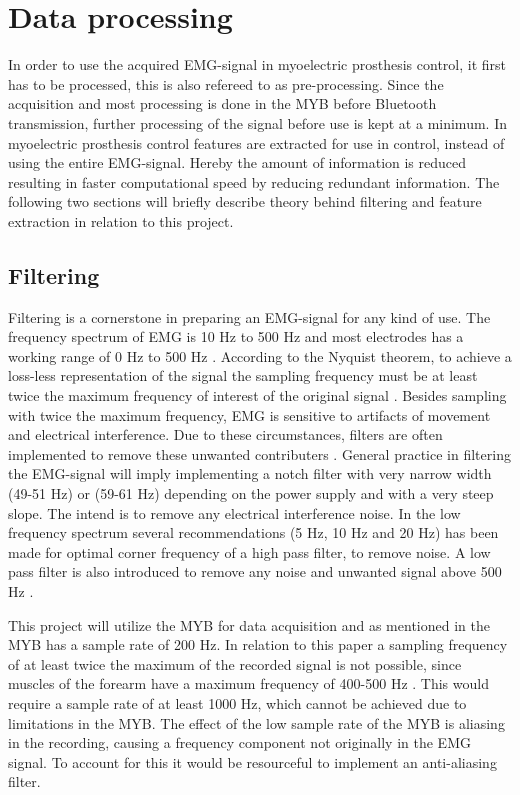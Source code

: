 \section{Data processing} \label{sec:pross}


In order to use the acquired EMG-signal in myoelectric prosthesis control, it first has to be processed, this is also refereed to as pre-processing. Since the acquisition and most processing is done in the MYB before Bluetooth transmission, further processing of the signal before use is kept at a minimum. In myoelectric prosthesis control features are extracted for use in control, instead of using the entire EMG-signal. Hereby the amount of information is reduced resulting in faster computational speed by reducing redundant information. The following two sections will briefly describe theory behind filtering and feature extraction in relation to this project.  


\subsection{Filtering} \label{sec:filt}

Filtering is a cornerstone in preparing an EMG-signal for any kind of use. The frequency spectrum of EMG is 10 Hz to 500 Hz and most electrodes has a working range of 0 Hz to 500 Hz \cite{DeLuca2010}. According to the Nyquist theorem, to achieve a loss-less representation of the signal the sampling frequency must be at least twice the maximum frequency of interest of the original signal \cite{Pozzo2004}. Besides sampling with twice the maximum frequency, EMG is sensitive to artifacts of movement and electrical interference. Due to these circumstances, filters are often implemented to remove these unwanted contributers \cite{DeLuca2010}. 
General practice in filtering the EMG-signal will imply implementing a notch filter with very narrow width (49-51 Hz) or (59-61 Hz) depending on the power supply and with a very steep slope. The intend is to remove any electrical interference noise. In the low frequency spectrum several recommendations (5 Hz, 10 Hz and 20 Hz) has been made for optimal corner frequency of a high pass filter, to remove noise. A low pass filter is also introduced to remove any noise and unwanted signal above 500 Hz \cite{Cram2012}. 

This project will utilize the MYB for data acquisition and as mentioned in  the MYB has a sample rate of 200 Hz. In relation to this paper a sampling frequency of at least twice the maximum of the recorded signal is not possible, since muscles of the forearm have a maximum frequency of 400-500 Hz \cite{Cram2012}. This would require a sample rate of at least 1000 Hz, which cannot be achieved due to limitations in the MYB. The effect of the low sample rate of the MYB is aliasing in the recording, causing a frequency component not originally in the EMG signal. To account for this it would be resourceful to implement an anti-aliasing filter.  

